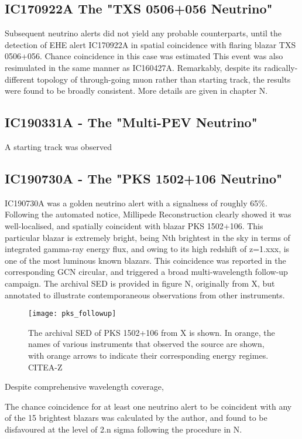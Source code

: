 \subsection{IC170922A The "TXS 0506+056 Neutrino"}
Subsequent neutrino alerts did not yield any probable counterparts, until the detection of EHE alert IC170922A in spatial coincidence with flaring blazar TXS 0506+056. Chance coincidence in this case was estimated  This event was also resimulated in the same manner as IC160427A. Remarkably, despite its radically-different topology of through-going muon rather than starting track, the results were found to be broadly consistent. More details are given in chapter N.

\subsection{IC190331A - The "Multi-PEV Neutrino"}

A starting track was observed 

\subsection{IC190730A - The "PKS 1502+106 Neutrino"}

IC190730A was a golden neutrino alert with a signalness of roughly 65\%. Following the automated notice, Millipede Reconstruction clearly showed it was well-localised, and spatially coincident with blazar PKS 1502+106. This particular blazar is extremely bright, being Nth brightest in the sky in terms of integrated gamma-ray energy flux, and owing to its high redshift of z=1.xxx, is one of the most luminous known blazars. This coincidence was reported in the corresponding GCN circular, and triggered a broad multi-wavelength follow-up campaign. The archival SED is provided in figure N, originally from X, but annotated to illustrate contemporaneous observations from other instruments.

\begin{figure}[!ht]
	\centering \texttt{[image: pks\_followup]}
	\caption{The archival SED of PKS 1502+106 from X is shown. In orange, the names of various instruments that observed the source are shown, with orange arrows to indicate their corresponding energy regimes. CITEA-Z}
	\label{fig:PKSobs}
\end{figure}

Despite comprehensive wavelength coverage, 

The chance coincidence for at least one neutrino alert to be coincident with any of the  15 brightest blazars was calculated by the author, and found to be disfavoured at the level of 2.n sigma following the procedure in N. 

